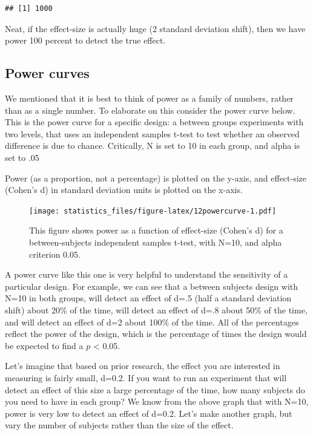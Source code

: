 \documentclass[]{book}
\begin{document}
\begin{verbatim}
## [1] 1000
\end{verbatim}

Neat, if the effect-size is actually huge (2 standard deviation shift), then we have power 100 percent to detect the true effect.

\hypertarget{power-curves}{%
\subsection{Power curves}\label{power-curves}}

We mentioned that it is best to think of power as a family of numbers, rather than as a single number. To elaborate on this consider the power curve below. This is the power curve for a specific design: a between groups experiments with two levels, that uses an independent samples t-test to test whether an observed difference is due to chance. Critically, N is set to 10 in each group, and alpha is set to .05

Power (as a proportion, not a percentage) is plotted on the y-axis, and effect-size (Cohen's d) in standard deviation units is plotted on the x-axis.

\begin{figure}
\centering
\texttt{[image: statistics\_files/figure-latex/12powercurve-1.pdf]}
\caption{\label{fig:12powercurve}This figure shows power as a function of effect-size (Cohen's d) for a between-subjects independent samples t-test, with N=10, and alpha criterion 0.05.}
\end{figure}

A power curve like this one is very helpful to understand the sensitivity of a particular design. For example, we can see that a between subjects design with N=10 in both groups, will detect an effect of d=.5 (half a standard deviation shift) about 20\% of the time, will detect an effect of d=.8 about 50\% of the time, and will detect an effect of d=2 about 100\% of the time. All of the percentages reflect the power of the design, which is the percentage of times the design would be expected to find a \(p\) \textless{} 0.05.

Let's imagine that based on prior research, the effect you are interested in measuring is fairly small, d=0.2. If you want to run an experiment that will detect an effect of this size a large percentage of the time, how many subjects do you need to have in each group? We know from the above graph that with N=10, power is very low to detect an effect of d=0.2. Let's make another graph, but vary the number of subjects rather than the size of the effect.
\end{document}
